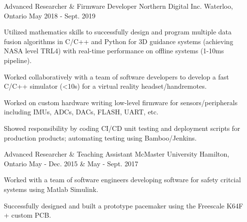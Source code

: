 \begin{cventries}
  \cventry
    {Advanced Researcher \& Firmware Developer} %
    {Northern Digital Inc.} %
    {Waterloo, Ontario} %
    {May 2018 - Sept. 2019} %
    {
      \begin{cvitems} %
        \item {Utilized mathematics skills to successfully design and program multiple data fusion algorithms in C/C++ and Python for 3D guidance systems (achieving NASA level TRL4) with real-time performance on offline systems (1-10ms pipeline).}
        \item {Worked collaboratively with a team of software developers to develop a fast C/C++ simulator (<10s) for a virtual reality headset/handremotes.}
        \item {Worked on custom hardware writing low-level firmware for sensors/peripherals including IMUs, ADCs, DACs, FLASH, UART, etc.}
        \item {Showed responsibility by coding CI/CD unit testing and deployment scripts for production products; automating testing using Bamboo/Jenkins.}
      \end{cvitems}
    }

  \cventry
    {Advanced Researcher \& Teaching Assistant} %
    {McMaster University} %
    {Hamilton, Ontario} %
    {May - Dec. 2015 \& May - Sept. 2017} %
    {
      \begin{cvitems} %
        \item {Worked with a team of software engineers developing software for safety critcial systems using Matlab Simulink.}
        \item {Successfully designed and built a prototype pacemaker using the Freescale K64F + custom PCB.}
      \end{cvitems}
    }


\end{cventries}

